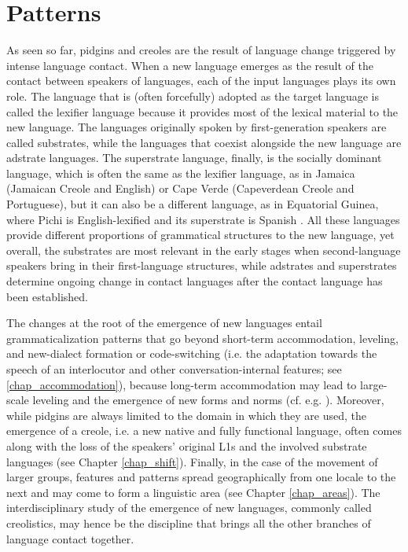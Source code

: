 \documentclass[output=paper]{langscibook}
\begin{document}
\section{Patterns} \label{sec:contact:patterns}

As seen so far, pidgins and creoles are the result of language change triggered by intense language contact. When a new language emerges as the result of the contact between speakers of languages, each of the input languages plays its own role. The language that is (often forcefully) adopted as the target language is called the lexifier language because it provides most of the lexical material to the new language. The languages originally spoken by first-generation speakers are called substrates, while the languages that coexist alongside the new language are adstrate languages. The superstrate language, finally, is the socially dominant language, which is often the same as the lexifier language, as in Jamaica (Jamaican Creole and English) or Cape Verde (Capeverdean Creole and Portuguese), but it can also be a different language, as in Equatorial Guinea, where Pichi is English-lexified and its superstrate is Spanish \citep[cf.][]{yakpo2017towards}. All these languages provide different proportions of grammatical structures to the new language, yet overall, the substrates are most relevant in the early stages when second-language speakers bring in their first-language structures, while adstrates and superstrates determine ongoing change in contact languages after the contact language has been established.

The changes at the root of the emergence of new languages entail grammaticalization patterns that go beyond short-term accommodation, leveling, and new-dialect formation or code-switching (i.e. the adaptation towards the speech of an interlocutor and other conversation-internal features; see \ref{chap_accommodation}), because long-term accommodation may lead to large-scale leveling and the emergence of new forms and norms (cf. e.g. \citealt{kerswill2010contact}). Moreover, while pidgins are always limited to the domain in which they are used, the emergence of a creole, i.e. a new native and fully functional language, often comes along with the loss of the speakers' original L1s and the involved substrate languages (see Chapter \ref{chap_shift}). Finally, in the case of the movement of larger groups, features and patterns spread geographically from one locale to the next and may come to form a linguistic area (see Chapter \ref{chap_areas}). 
The interdisciplinary study of the emergence of new languages, commonly called creolistics, may hence be the discipline that brings all the other branches of language contact together.
\end{document}
